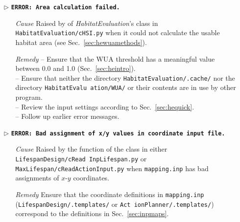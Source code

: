 \begin{itemize}
	\item[$\triangleright$]\textbf{\texttt{ERROR: Area calculation failed.}}
	\begin{itemize}
		\item[\textit{Cause}\hspace{0.27cm}] Raised by  of \textit{HabitatEvaluation}'s  class in \texttt{HabitatEvaluation/cHSI.py} when it could not calculate the usable habitat area (see Sec.~\ref{sec:hewuamethods}).
		\item[\textit{Remedy}] -- Ensure that the WUA threshold has a meaningful value between 0.0 and 1.0 (Sec.~\ref{sec:heintro}).\\
							 -- Ensure that neither the directory \texttt{HabitatEvaluation/.cache/} nor the directory \texttt{HabitatEvalu ation/WUA/} or their contents are in use by other program.\\
							 -- Review the input settings according to Sec.~\ref{sec:hequick}.\\
							 -- Follow up earlier error messages.\\
	\end{itemize}
	
	\item[$\triangleright$]\textbf{\texttt{ERROR: Bad assignment of x/y values in coordinate input file.}}
	\begin{itemize}
		\item[\textit{Cause}\hspace{0.27cm}] Raised by the  function of the  class in either \texttt{LifespanDesign/cRead InpLifespan.py} or \texttt{MaxLifespan/cReadActionInput.py} when \texttt{mapping.inp} has bad assignments of $x$-$y$ coordinates.
		\item[\textit{Remedy}] Ensure that the coordinate definitions in \texttt{mapping.inp} (\texttt{LifespanDesign/.templates/} or \texttt{Act ionPlanner/.templates/}) correspond to the definitions in Sec.~\ref{sec:inpmaps}.\\
	\end{itemize}
	

\end{itemize}
